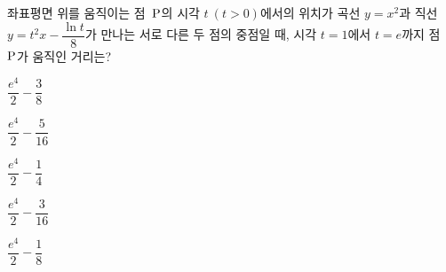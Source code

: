좌표평면 위를 움직이는 점~$\mathrm{P}$의 시각 $t\ (t>0)$에서의 위치가 곡선 $y=x^2$과 직선 $y=t^2x-\dfrac{\ln t}{8}$가 만나는 서로 다른 두 점의 중점일 때, 시각 $t=1$에서 $t=e$까지 점~$\mathrm{P}$가 움직인 거리는?
\begin{choices32}{\rule[-3ex]{0pt}{8ex}$\dfrac{e^4}{2}-\dfrac{3}{8}$}{\rule[-3ex]{0pt}{8ex}$\dfrac{e^4}{2}-\dfrac{5}{16}$}{\rule[-3ex]{0pt}{8ex}$\dfrac{e^4}{2}-\dfrac{1}{4}$}{\rule[-3ex]{0pt}{8ex}$\dfrac{e^4}{2}-\dfrac{3}{16}$}{\rule[-3ex]{0pt}{8ex}$\dfrac{e^4}{2}-\dfrac{1}{8}$}\end{choices32}
